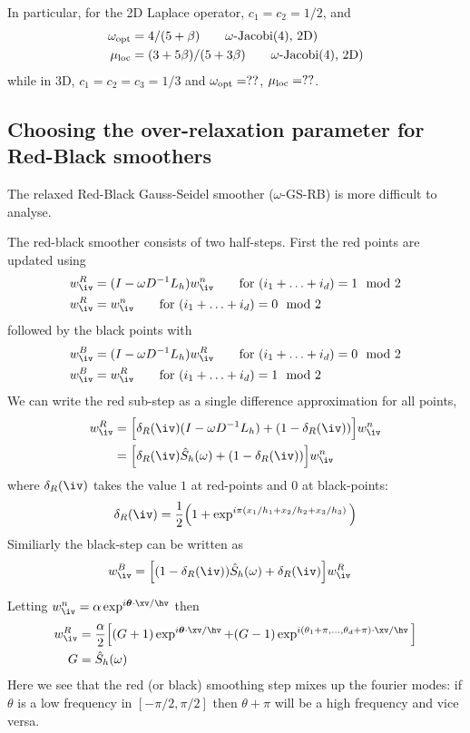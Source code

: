 \documentclass[12pt]{article}
\begin{document}
In particular, for the 2D Laplace operator, $c_1=c_2=1/2$,  and
\begin{align*}
 \omega_{\rm opt} & =4/(5+\beta)  \qquad \mbox{$\omega$-Jacobi(4), 2D)} \\
  \mu_{\rm loc} & =(3+5\beta)/(5+3\beta) \qquad \mbox{$\omega$-Jacobi(4), 2D)}
\end{align*}
while in 3D, $c_1=c_2=c_3=1/3$ and $\omega_{\rm opt}=??$, $\mu_{\rm loc}=??$.


\subsection{Choosing the over-relaxation parameter for Red-Black smoothers}

The relaxed Red-Black Gauss-Seidel smoother ($\omega$-GS-RB) is more difficult to analyse.


The red-black smoother consists of two half-steps. First the red points are updated using
\begin{align*}
  w_{\iv}^R &=  (I - \omega D^{-1} L_h ) w_{\iv}^{n}   \qquad\mbox{for $(i_1+\ldots+i_d) = 1\mod 2$} \\
  w_{\iv}^R &= w_{\iv}^{n} \qquad\mbox{for $(i_1+\ldots+i_d) = 0\mod 2$}
\end{align*}
followed by the black points with 
\begin{align*}
  w_{\iv}^B &=  (I - \omega D^{-1} L_h ) w_{\iv}^{R}   \qquad\mbox{for $(i_1+\ldots+i_d) = 0\mod 2$} \\
  w_{\iv}^B &= w_{\iv}^{R} \qquad\mbox{for $(i_1+\ldots+i_d) = 1\mod 2$}
\end{align*}
We can write the red sub-step as a single difference approximation for all points, 
\begin{align*}
  w_{\iv}^R &= \Big[ \delta_R(\iv) (I - \omega D^{-1} L_h ) + (1-\delta_R(\iv)) \Big] w_{\iv}^{n} \\
            &= \Big[ \delta_R(\iv) \hat{S}_h(\omega) + (1-\delta_R(\iv)) \Big] w_{\iv}^{n}
\end{align*}
where $\delta_R(\iv)$ takes the value $1$ at red-points and $0$ at black-points:
\[
  \delta_R(\iv) = {1\over2}\Big( 1 + \exp^{i \pi( x_1/h_1 + x_2/h_2 + x_3/h_3 ) } \Big)
\]
Similiarly the black-step can be written as
\begin{align*}
  w_{\iv}^B &= \Big[ (1-\delta_R(\iv)) \hat{S}_h(\omega) + \delta_R(\iv) \Big] w_{\iv}^{R}
\end{align*}

Letting $w_{\iv}^{n} = \alpha \exp^{ i \thetav\cdot\xv/\hv }$ then
\begin{align*}
w_{\iv}^R &={\alpha\over2}\Big[ (G+1)\exp^{ i \thetav\cdot\xv/\hv } 
           + (G-1)\exp^{ i (\theta_1+\pi,\ldots,\theta_d+\pi)\cdot\xv/\hv } \Big] \\
   G&= \hat{S}_h(\omega)
\end{align*}
Here we see that the red (or black) smoothing step mixes up the fourier modes: if $\theta$ is a 
low frequency in $[-\pi/2,\pi/2]$ then $\theta+\pi$ will be a high frequency and vice versa.
\end{document}
